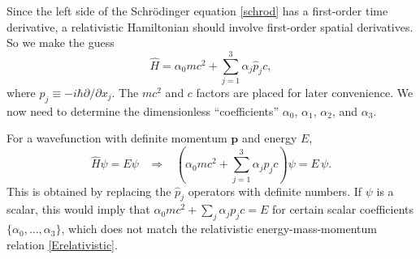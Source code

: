 \documentclass[prx,12pt]{revtex4-2}
\begin{document}
Since the left side of the Schr\"odinger equation \eqref{schrod} has a
first-order time derivative, a relativistic Hamiltonian should involve
first-order spatial derivatives.  So we make the guess
\begin{equation}
  \hat{H} = \alpha_0 mc^2 + \sum_{j=1}^3 \alpha_j \hat{p}_j c,
  \label{Dirac0}
\end{equation}
where $\hat{p}_j \equiv -i\hbar \partial/\partial x_j$.  The $mc^2$
and $c$ factors are placed for later convenience.  We now need to
determine the dimensionless ``coefficients'' $\alpha_0$, $\alpha_1$,
$\alpha_2$, and $\alpha_3$.

For a wavefunction with definite momentum $\mathbf{p}$ and energy
$E$,
\begin{equation}
  \hat{H}\psi = E \psi \;\;\;\Rightarrow \;\;\;
  \left(\alpha_0mc^2 + \sum_{j=1}^3\alpha_j p_jc\right) \psi = E\,\psi.
\end{equation}
This is obtained by replacing the $\hat{p}_j$ operators with definite
numbers.  If $\psi$ is a scalar, this would imply that $\alpha_0 mc^2
+ \sum_{j}\alpha_j p_j c = E$ for certain scalar coefficients
$\{\alpha_0, \dots, \alpha_3\}$, which does not match the relativistic
energy-mass-momentum relation \eqref{Erelativistic}.
\end{document}
